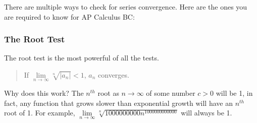\documentclass[../revisedmain.tex]{subfiles}
\begin{document}
	There are multiple ways to check for series convergence. Here are the ones you are required to know for AP Calculus BC:
	\subsubsection{The Root Test} The root test is the most powerful of all the tests.
	\begin{quote}
		If $\lim\limits_{n\to\infty}\sqrt[n]{|a_n|}<1$, $a_n$ converges.
	\end{quote}
	Why does this work? The $n^{th}$ root as $n\to\infty$ of some number $c>0$ will be 1, in fact, any function that grows slower than exponential growth will have an $n^{th}$ root of 1. For example, $\lim\limits_{n\to\infty}\sqrt[n]{1000000000n^1000000000000}$ will always be 1.
\end{document}
